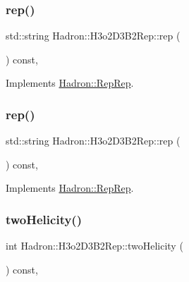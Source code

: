 \subsubsection{\texorpdfstring{rep()}{rep()}\hspace{0.1cm}{\footnotesize\ttfamily [4/5]}}
{\footnotesize\ttfamily std\+::string Hadron\+::\+H3o2\+D3\+B2\+Rep\+::rep (\begin{DoxyParamCaption}{ }\end{DoxyParamCaption}) const\hspace{0.3cm}{\ttfamily [inline]}, {\ttfamily [virtual]}}



Implements \mbox{\hyperlink{structHadron_1_1RepRep_ab3213025f6de249f7095892109575fde}{Hadron\+::\+Rep\+Rep}}.

\mbox{\label{structHadron_1_1H3o2D3B2Rep_a7b7bbc5fa5a2e13412b53abb425dc0fd}} 
\subsubsection{\texorpdfstring{rep()}{rep()}\hspace{0.1cm}{\footnotesize\ttfamily [5/5]}}
{\footnotesize\ttfamily std\+::string Hadron\+::\+H3o2\+D3\+B2\+Rep\+::rep (\begin{DoxyParamCaption}{ }\end{DoxyParamCaption}) const\hspace{0.3cm}{\ttfamily [inline]}, {\ttfamily [virtual]}}



Implements \mbox{\hyperlink{structHadron_1_1RepRep_ab3213025f6de249f7095892109575fde}{Hadron\+::\+Rep\+Rep}}.

\mbox{\label{structHadron_1_1H3o2D3B2Rep_ad5a4c1e91f9852b28e13bb4813fe6e84}} 
\subsubsection{\texorpdfstring{twoHelicity()}{twoHelicity()}\hspace{0.1cm}{\footnotesize\ttfamily [1/3]}}
{\footnotesize\ttfamily int Hadron\+::\+H3o2\+D3\+B2\+Rep\+::two\+Helicity (\begin{DoxyParamCaption}{ }\end{DoxyParamCaption}) const\hspace{0.3cm}{\ttfamily [inline]}, {\ttfamily [virtual]}}

